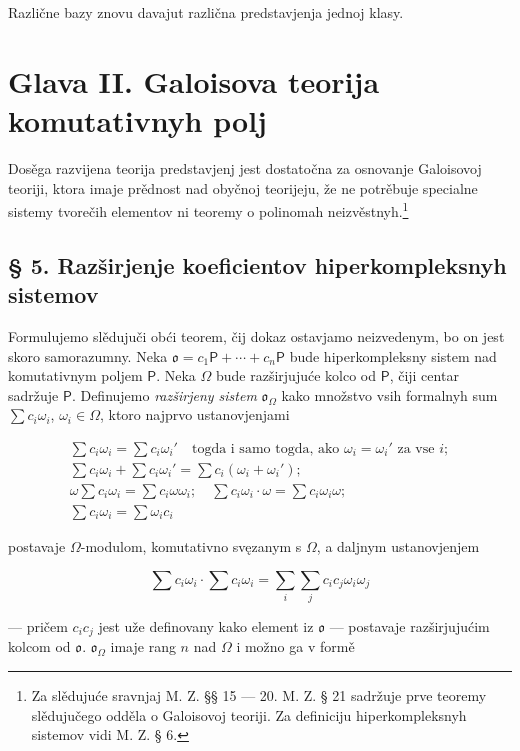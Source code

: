 \documentclass[11pt]{article}
\newcommand{\srcfn}[2]{\footnote{#2}}
\begin{document}
Različne bazy znovu davajut različna predstavjenja jednoj klasy.

\section*{Glava II. Galoisova teorija komutativnyh polj}\label{kapitel-ii.-galoissche-theorie-kommutativer-koerper}

Dosěga razvijena teorija predstavjenj jest dostatočna za osnovanje Galoisovoj teoriji, ktora imaje prědnost nad obyčnoj teorijeju, že ne potrěbuje specialne sistemy tvorečih elementov ni teoremy o polinomah neizvěstnyh.\srcfn{1}{Za slědujuće sravnjaj M. Z. §§ 15 --- 20. M. Z. § 21 sadržuje prve teoremy slědujučego odděla o Galoisovoj teoriji. Za definiciju hiperkompleksnyh sistemov vidi M. Z. § 6.}

\subsection*{§ 5. Razširjenje koeficientov hiperkompleksnyh sistemov}\label{koeffizientenerweiterung-hyperkomplexer-systeme}

Formulujemo slědujuči obći teorem, čij dokaz ostavjamo neizvedenym, bo on jest skoro samorazumny. Neka \(\mathfrak{o}=c_1\mathsf P+\cdots+c_n\mathsf P\) bude hiperkompleksny sistem nad komutativnym poljem \(\mathsf P\). Neka \(\Omega\) bude razširjujuće kolco od \(\mathsf P\), čiji centar sadržuje \(\mathsf P\). Definujemo \emph{razširjeny sistem} \(\mathfrak{o}_{\Omega}\) kako množstvo vsih formalnyh sum \(\sum c_i\omega_i\), \(\omega_i\in\Omega\), ktoro najprvo ustanovjenjami

\[
\begin{array}{l}
\sum c_i\omega_i=\sum c_i\omega_i' \quad\text{togda i samo togda, ako } \omega_i=\omega_i' \text{ za vse } i;\\
\sum c_i\omega_i+\sum c_i\omega_i'=\sum c_i(\omega_i+\omega_i');\\
\omega\sum c_i\omega_i=\sum c_i\omega\omega_i;\quad
\sum c_i\omega_i\cdot\omega=\sum c_i\omega_i\omega;\\
\sum c_i\omega_i=\sum \omega_i c_i
\end{array}
\]

postavaje \(\Omega\)-modulom, komutativno svęzanym s \(\Omega\), a daljnym ustanovjenjem

\[
\sum c_i\omega_i\cdot \sum c_i\omega_i
=\sum_i\sum_j c_ic_j\omega_i\omega_j
\]

--- pričem \(c_ic_j\) jest uže definovany kako element iz \(\mathfrak{o}\) --- postavaje razširjujućim kolcom od \(\mathfrak{o}\). \(\mathfrak{o}_{\Omega}\) imaje rang \(n\) nad \(\Omega\) i možno ga v formě
\end{document}
